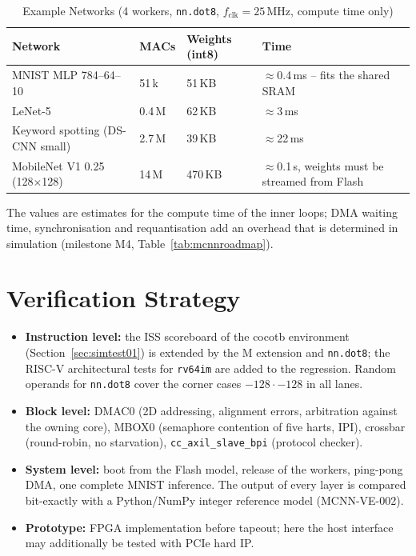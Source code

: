 \begin{table}[H]
\caption{Example Networks (4 workers, \texttt{nn.dot8}, $f_\text{clk} = 25$\,MHz, compute time only)}
\label{tab:mcnnnets}
\centering
{\footnotesize
\begin{tabularx}{\textwidth}{|l |l |l |X|}
  \hline
  Network & MACs & Weights (int8) & Time \\
  \hline
  \hline
  MNIST MLP 784--64--10 & 51\,k & 51\,KB & $\approx$0.4\,ms -- fits the shared SRAM \\
  \hline
  LeNet-5 & 0.4\,M & 62\,KB & $\approx$3\,ms \\
  \hline
  Keyword spotting (DS-CNN small) & 2.7\,M & 39\,KB & $\approx$22\,ms \\
  \hline
  MobileNet V1 0.25 (128$\times$128) & 14\,M & 470\,KB & $\approx$0.1\,s, weights must be streamed from Flash \\
  \hline
\end{tabularx}}
\end{table}

The values are estimates for the compute time of the inner loops; DMA
waiting time, synchronisation and requantisation add an overhead that is
determined in simulation (milestone M4, Table~\ref{tab:mcnnroadmap}).

\section{Verification Strategy}
\label{sec:mcnnverif}

\begin{itemize}
  \item \textbf{Instruction level:} the ISS scoreboard of the cocotb
    environment (Section~\ref{sec:simtest01}) is extended by the M
    extension and \texttt{nn.dot8}; the RISC-V architectural tests for
    \texttt{rv64im} are added to the regression. Random operands for
    \texttt{nn.dot8} cover the corner cases $-128 \cdot -128$ in all lanes.
  \item \textbf{Block level:} DMAC0 (2D addressing, alignment errors,
    arbitration against the owning core), MBOX0 (semaphore contention of
    five harts, IPI), crossbar (round-robin, no starvation),
    \texttt{cc\_axil\_slave\_bpi} (protocol checker).
  \item \textbf{System level:} boot from the Flash model, release of the
    workers, ping-pong DMA, one complete MNIST inference.
    The output of every layer is compared bit-exactly with a
    Python/NumPy integer reference model (MCNN-VE-002).
  \item \textbf{Prototype:} FPGA implementation before tapeout; here the
    host interface may additionally be tested with PCIe hard IP.
\end{itemize}

